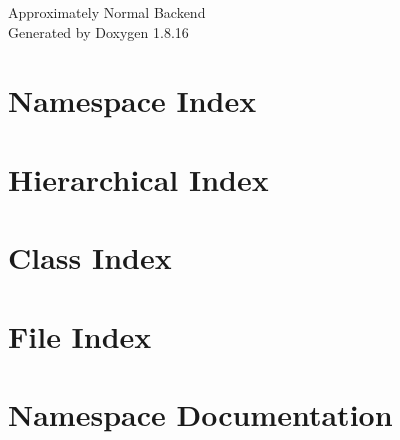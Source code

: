 \let\mypdfximage\pdfximage\def\pdfximage{\immediate\mypdfximage}\documentclass[twoside]{book}
\newcommand{\+}{\discretionary{\mbox{\scriptsize$\hookleftarrow$}}{}{}}
\newcommand{\clearemptydoublepage}{%
  \newpage{\pagestyle{empty}\cleardoublepage}%
}
\begin{document}
\hypersetup{pageanchor=false,
             bookmarksnumbered=true,
             pdfencoding=unicode
            }
\begin{titlepage}
\vspace*{7cm}
\begin{center}%
{\Large Approximately Normal Backend }\\
\vspace*{1cm}
{\large Generated by Doxygen 1.8.16}\\
\end{center}
\end{titlepage}
\clearemptydoublepage
{}
\tableofcontents
\clearemptydoublepage
{}
\hypersetup{pageanchor=true}

\chapter{Namespace Index}

\chapter{Hierarchical Index}

\chapter{Class Index}

\chapter{File Index}

\chapter{Namespace Documentation}








\end{document}
